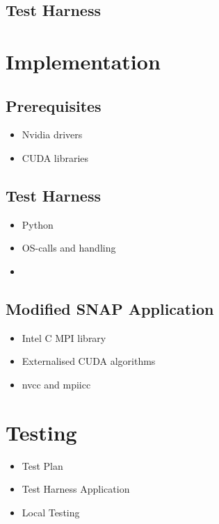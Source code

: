 \documentclass[conference]{IEEEtran}
\begin{document}
\subsection{Test Harness}





\section{Implementation}\label{implementation}

\subsection{Prerequisites}
\begin{itemize}
    \item Nvidia drivers
    \item CUDA libraries
\end{itemize}

\subsection{Test Harness}
\begin{itemize}
    \item Python
    \item OS-calls and handling
    \item 
\end{itemize}

\subsection{Modified SNAP Application}
\begin{itemize}
    \item Intel C MPI library
    \item Externalised CUDA algorithms
    \item nvcc and mpiicc
\end{itemize}


\section{Testing}\label{testing}

\begin{itemize}
    \item Test Plan
    \item Test Harness Application
    \item Local Testing
\end{itemize}
\end{document}
